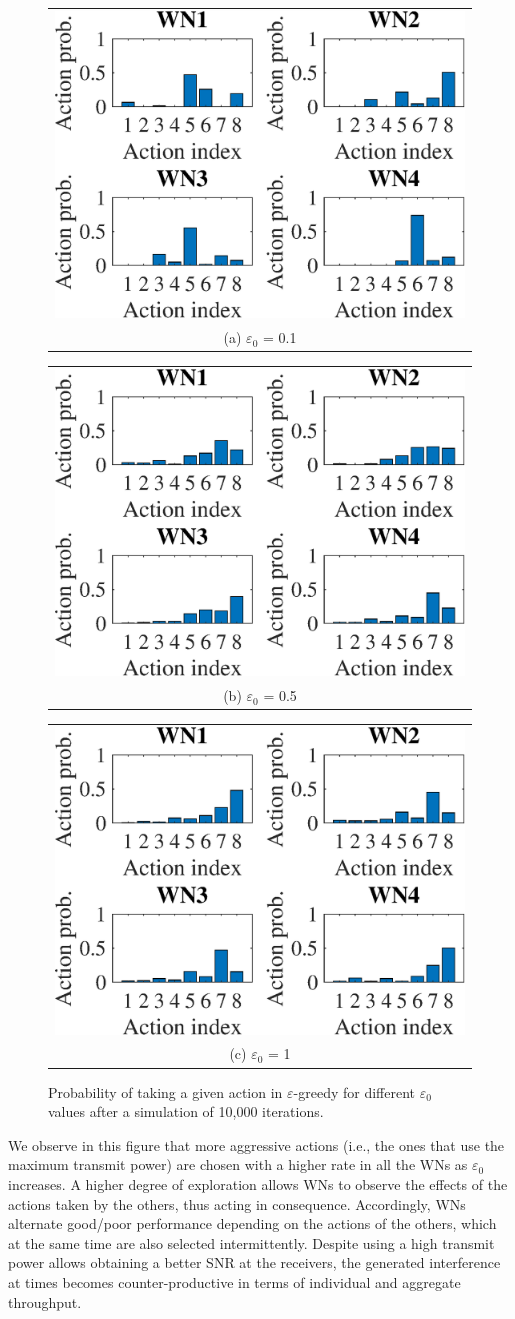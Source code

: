 \documentclass[preprint,12pt]{elsarticle}
\begin{document}
\begin{figure}
	\centering
	\begin{tabular}{@{}c@{}}
		\includegraphics[width=.3\textwidth]{images/NEW_actions_probability_e-greedy_e01} \\[\abovecaptionskip]
		\small (a) $\varepsilon_0$ = 0.1
		\label{fig:eg_e01_actions_distr}
	\end{tabular}	
	\hspace{\floatsep}	
	\begin{tabular}{@{}c@{}}
		\includegraphics[width=.3\textwidth]{images/NEW_actions_probability_e-greedy_e05} \\[\abovecaptionskip]
		\small (b) $\varepsilon_0$ = 0.5
		\label{fig:eg_e05_actions_distr}
	\end{tabular}
	\hspace{\floatsep}
	\begin{tabular}{@{}c@{}}
		\includegraphics[width=.3\textwidth]{images/NEW_actions_probability_e-greedy_e1} \\[\abovecaptionskip]
		\small (c) $\varepsilon_0$ = 1
		\label{fig:eg_1_actions_distr}
	\end{tabular}
	\caption{Probability of taking a given action in $\varepsilon$-greedy for different $\varepsilon_0$ values after a simulation of 10,000 iterations.}
	\label{fig:eg_actions_distr}
\end{figure}

We observe in this figure that more aggressive actions (i.e., the ones that use the maximum transmit power) are chosen with a higher rate in all the WNs as $\varepsilon_0$ increases. A higher degree of exploration allows WNs to observe the effects of the actions taken by the others, thus acting in consequence. Accordingly, WNs alternate good/poor performance depending on the actions of the others, which at the same time are also selected intermittently. Despite using a high transmit power allows obtaining a better SNR at the receivers, the generated interference at times becomes counter-productive in terms of individual and aggregate throughput.	
\end{document}
